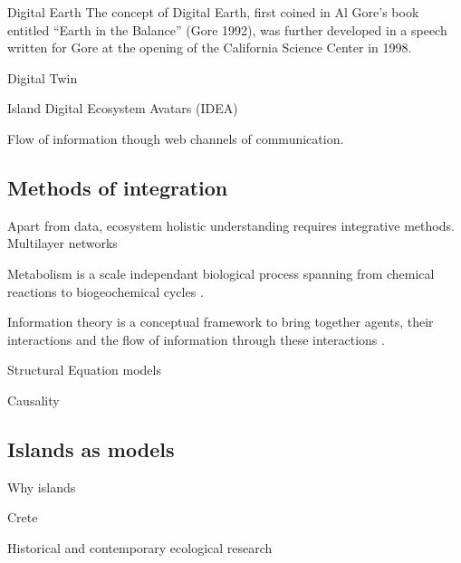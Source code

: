 Digital Earth
The concept of Digital Earth, first coined in Al Gore’s book entitled 
“Earth in the Balance” (Gore 1992), was further developed in a speech
written for Gore at the opening of the California Science Center in 1998.

Digital Twin

Island Digital Ecosystem Avatars (IDEA)

Flow of information though web channels of communication.

\subsection{Methods of integration}
\label{sec:meth-int}

Apart from data, ecosystem holistic understanding requires integrative methods.
Multilayer networks \citep{marine-multilayers}

Metabolism is a scale independant biological process spanning from chemical reactions
to biogeochemical cycles \citep{hall2018understanding}. 

Information theory is a conceptual framework to bring together agents,
their interactions and the flow of information through these interactions \citep{oconnor-information-ecology}.

Structural Equation models

Causality

\subsection{Islands as models}
\label{sec:island-model}

Why islands

Crete 

Historical and contemporary ecological research
